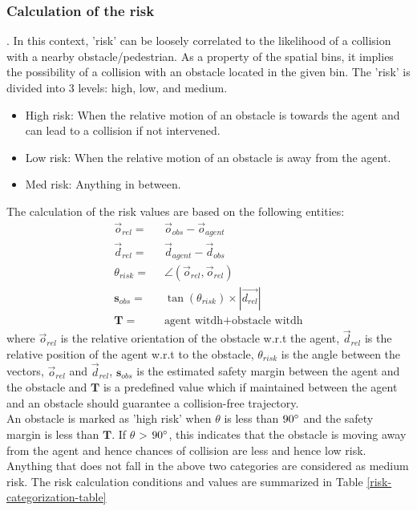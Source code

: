 \subsubsection*{Calculation of the risk}
. In this context, 'risk' can be loosely correlated to the likelihood of a collision with a nearby obstacle/pedestrian. As a property of the spatial bins, it implies the possibility of a collision with an obstacle located in the given bin. 
The 'risk' is divided into 3 levels: high, low, and medium.
\begin{itemize}
    \item High risk:
When the relative motion of an obstacle is towards the agent and can lead to a collision if not intervened.
    \item Low risk:
When the relative motion of an obstacle is away from the agent.
    \item Med risk:
Anything in between.
\end{itemize}
The calculation of the risk values are based on the following entities:
\begin{align}
    \vec{o}_{rel} = & \;\; \vec{o}_{obs} - \vec{o}_{agent}  \\
    \vec{d}_{rel} =  &\;\; \vec{d}_{agent} - \vec{d}_{obs} \\
    \theta_{risk} =  & \;\; \angle (\vec{o}_{rel}, \vec{o}_{rel}) \\
    \mathbf{s}_{obs} = & \;\; \tan(\theta_{risk}) \times |\vec{d_{rel}}| \\
    \mathbf{T} = & \;\; \text{agent witdh} + \text{obstacle witdh}
\end{align}
where $\vec{o}_{rel}$ is the relative orientation of the obstacle w.r.t the agent, $\vec{d}_{rel}$ is the relative position of the agent w.r.t to the obstacle, $\theta_{risk}$ is the angle between the vectors, $\vec{o}_{rel}$ and $\vec{d}_{rel}$,  $\mathbf{s}_{obs}$ is the estimated safety margin between the agent and the obstacle and $\mathbf{T}$ is a predefined value which if maintained between the agent and an obstacle should guarantee a collision-free trajectory.\\
An obstacle is marked as 'high risk' when $\theta$ is less than $90\degree$ and the safety margin is less than $\mathbf{T}$.   If $\theta$ > $90 \degree$, this indicates that the obstacle is moving away from the agent and hence chances of collision are less and hence low risk. Anything that does not fall in the above two categories are considered as medium risk. The risk calculation conditions and values are summarized in Table \ref{risk-categorization-table}
